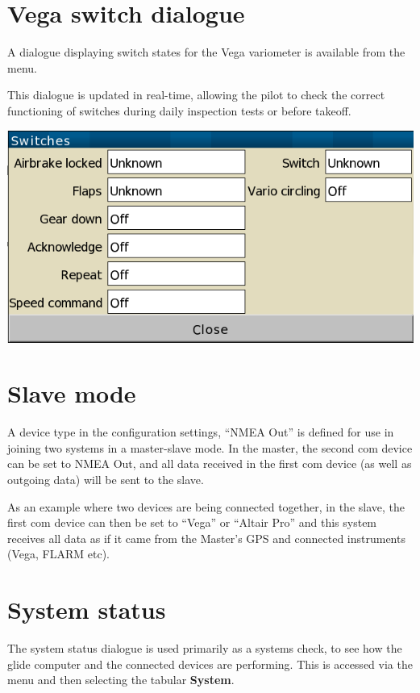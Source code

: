 \section{Vega switch dialogue}

A dialogue displaying switch states for the Vega variometer
is available from the menu.

This dialogue is updated in real-time, allowing the pilot
to check the correct functioning of switches during daily
inspection tests or before takeoff. 

\begin{center}
\includegraphics[angle=0,width=0.7\linewidth,keepaspectratio='true']{figures/dialog-switches.png}
\end{center}

\section{Slave mode}

A device type in the configuration settings, ``NMEA Out'' is defined
for use in joining two systems in a master-slave mode.
In the master, the second com device can be set to NMEA Out, and all
data received in the first com device (as well as outgoing data) will
be sent to the slave.  

As an example where two devices are being connected together, in the
slave, the first com device can then be set to ``Vega'' or ``Altair
Pro'' and this system receives all data as if it came from the
Master's GPS and connected instruments (Vega, FLARM etc).


\section{System status}\label{sec:system-status}

The system status dialogue is
used primarily as a systems check, to see how the glide computer and the 
connected devices are performing.  This is accessed via the menu 
and then selecting the tabular {\bf System}.

